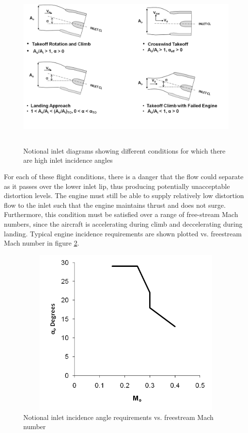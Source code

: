 \documentclass[12pt]{gatech-thesis}
\begin{document}
	\begin{figure}[htpb]
	\centering
	\includegraphics[width=140mm, height =85mm, clip=true, trim = 0mm 0mm 0mm 0mm]{Inlet_Incidence_Conditions.png}
	\caption{Notional inlet diagrams showing different conditions for which there are high inlet incidence angles \cite{Oates1989}}
	\label{Circumferential_Distortion}
	\end{figure}
For each of these flight conditions, there is a danger that the flow could separate as it passes over the lower inlet lip, thus producing potentially unacceptable distortion levels.  The engine must still be able to supply relatively low distortion flow to the inlet such that the engine maintains thrust and does not surge.  Furthermore, this condition must be satisfied over a range of free-stream Mach numbers, since the aircraft is accelerating during climb and deccelerating during landing.  Typical engine incidence requirements are shown plotted vs. freestream Mach number in figure \ref{Alpha_Incidence_Requirements}.  

	\begin{figure}[htpb]
	\centering
	\includegraphics[width=120mm, height =85mm, clip=true, trim = 0mm 0mm 0mm 0mm]{Alpha_Incidence_Requirements.png}
	\caption{Notional inlet incidence angle requirements vs. freestream Mach number \cite{Oates1989}}
	\label{Alpha_Incidence_Requirements}
	\end{figure}
\end{document}
